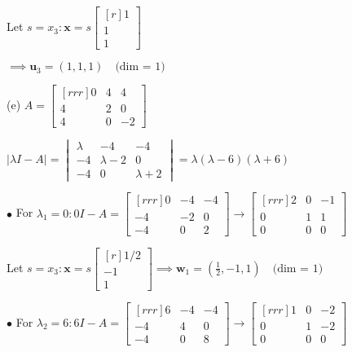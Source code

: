 \documentclass{article}
\newcommand\ddfrac[2]{\frac{\displaystyle #1}{\displaystyle #2}}
\begin{document}
\begin{minipage}[t]{0.48\linewidth}
    Let $s = x_3: \textbf{x} = s \begin{bmatrix}[r]
        1 \\ 1 \\ 1 
    \end{bmatrix}$

    $\implies \textbf{u}_3 = (1,1,1) \quad \text{(dim = 1)}$


    \end{minipage}

    \begin{minipage}[t]{0.48\linewidth}
        (e) $A = \begin{bmatrix}[rrr]
            0 & 4 & 4 \\
            4 & 2 & 0 \\
            4 & 0 & -2 
        \end{bmatrix}$

        $| \lambda I - A| = \begin{vmatrix}
            \lambda  & -4 & -4 \\
            -4 & \lambda  -2 & 0 \\
            -4 & 0 & \lambda  + 2 
        \end{vmatrix} = \lambda ( \lambda  - 6 )( \lambda  + 6 )$

        $\bullet$  For $ \lambda _1 = 0 : 0I - A = \begin{bmatrix}[rrr]
            0 & -4 & - 4 \\
            -4 & -2 & 0 \\
            -4 & 0 & 2 
        \end{bmatrix} \to \begin{bmatrix}[rrr]
            2 & 0 & -1 \\ 
            0 & 1 & 1 \\
            0 & 0 & 0 
        \end{bmatrix} $

        Let $s = x_3: \textbf{x} = s \begin{bmatrix}[r]
            1/2 \\
            -1 \\
            1
        \end{bmatrix} \implies \textbf{w} _1 = ( \ddfrac{1}{2} , -1, 1 ) \quad \text{(dim = 1)}$

        $\bullet$ For $ \lambda _2 = 6: 6I - A = \begin{bmatrix}[rrr]
            6 & -4 & - 4 \\
            -4 & 4 & 0 \\
            -4 & 0 & 8 
        \end{bmatrix} \to \begin{bmatrix}[rrr]
            1 & 0 & -2 \\
            0 & 1 & -2 \\
            0 & 0 & 0 
        \end{bmatrix} $


\end{minipage}
\end{document}
